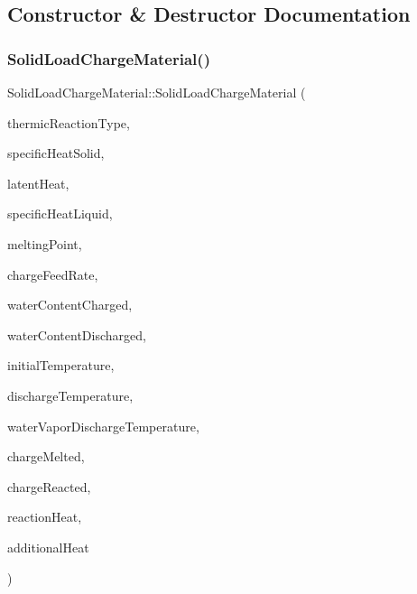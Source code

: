 \subsection{Constructor \& Destructor Documentation}
\mbox{\label{class_solid_load_charge_material_a9145db5518b94cfc1919b8d6ff809f5e}} 
\subsubsection{\texorpdfstring{Solid\+Load\+Charge\+Material()}{SolidLoadChargeMaterial()}\hspace{0.1cm}{\footnotesize\ttfamily [1/3]}}
{\footnotesize\ttfamily Solid\+Load\+Charge\+Material\+::\+Solid\+Load\+Charge\+Material (\begin{DoxyParamCaption}\item[{const \hyperlink{namespace_load_charge_material_a51d4263e865a5d86236622dd3fe23fd1}{Load\+Charge\+Material\+::\+Thermic\+Reaction\+Type}}]{thermic\+Reaction\+Type,  }\item[{const double}]{specific\+Heat\+Solid,  }\item[{const double}]{latent\+Heat,  }\item[{const double}]{specific\+Heat\+Liquid,  }\item[{const double}]{melting\+Point,  }\item[{const double}]{charge\+Feed\+Rate,  }\item[{const double}]{water\+Content\+Charged,  }\item[{const double}]{water\+Content\+Discharged,  }\item[{const double}]{initial\+Temperature,  }\item[{const double}]{discharge\+Temperature,  }\item[{const double}]{water\+Vapor\+Discharge\+Temperature,  }\item[{const double}]{charge\+Melted,  }\item[{const double}]{charge\+Reacted,  }\item[{const double}]{reaction\+Heat,  }\item[{const double}]{additional\+Heat }\end{DoxyParamCaption})\hspace{0.3cm}{\ttfamily [inline]}}

